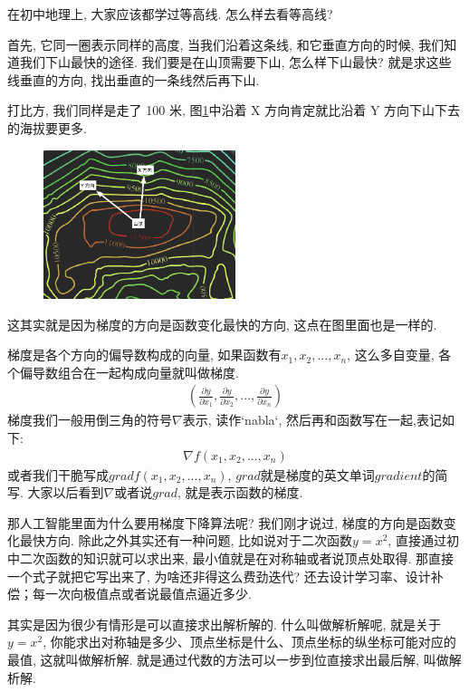 在初中地理上, 大家应该都学过等高线. 怎么样去看等高线? 

首先, 它同一圈表示同样的高度, 当我们沿着这条线, 和它垂直方向的时候, 我们知道我们下山最快的途径. 我们要是在山顶需要下山, 怎么样下山最快? 就是求这些线垂直的方向, 找出垂直的一条线然后再下山. 

打比方, 我们同样是走了 100 米, 图\ref{fig:img13_2}中沿着 X 方向肯定就比沿着 Y 方向下山下去的海拔要更多. 

\begin{figure}[ht]
  \centering
  \includegraphics[width=0.5\textwidth]{asset/20230901223615.png}
  \caption{}
  \label{fig:img13_2}
\end{figure}

这其实就是因为梯度的方向是函数变化最快的方向, 这点在图里面也是一样的. 

梯度是各个方向的偏导数构成的向量, 如果函数有$x_1, x_2,..., x_n$, 这么多自变量, 各个偏导数组合在一起构成向量就叫做梯度. 
\begin{align*}
  (\frac{\partial y}{\partial x_1},\frac{\partial y}{\partial x_2},..., \frac{\partial y}{\partial x_n})
\end{align*}
梯度我们一般用倒三角的符号$\nabla$表示, 读作`nabla`, 然后再和函数写在一起,表记如下:
\begin{align*}
  \nabla f(x_1, x_2, ..., x_n)
\end{align*}
或者我们干脆写成$grad f(x_1, x_2, ..., x_n)$,  $\mathord{grad}$就是梯度的英文单词$\mathord{gradient}$的简写. 大家以后看到$\nabla$或者说$grad$, 就是表示函数的梯度. 

那人工智能里面为什么要用梯度下降算法呢?  我们刚才说过, 梯度的方向是函数变化最快方向. 除此之外其实还有一种问题, 比如说对于二次函数$y=x^2$, 直接通过初中二次函数的知识就可以求出来, 最小值就是在对称轴或者说顶点处取得. 那直接一个式子就把它写出来了, 为啥还非得这么费劲迭代? 还去设计学习率、设计补偿；每一次向极值点或者说最值点逼近多少. 

其实是因为很少有情形是可以直接求出解析解的. 什么叫做解析解呢, 就是关于$y = x^2$, 你能求出对称轴是多少、顶点坐标是什么、顶点坐标的纵坐标可能对应的最值, 这就叫做解析解. 就是通过代数的方法可以一步到位直接求出最后解, 叫做解析解. 

